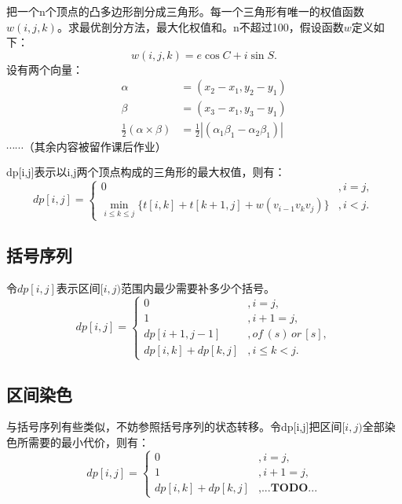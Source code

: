 把一个n个顶点的凸多边形剖分成三角形。每一个三角形有唯一的权值函数$w(i,j,k)$。求最优剖分方法，最大化权值和。n不超过100，假设函数$w$定义如下：
\begin{equation*}
    w(i,j,k)=e\cos C+i\sin S.
\end{equation*}
设有两个向量：
\begin{equation*}
    \begin{aligned}
        \alpha&=(x_2-x_1,y_2-y_1)\\
        \beta&=(x_3-x_1,y_3-y_1)\\
        \frac{1}{2}(\alpha\times\beta)&=\frac{1}{2}|(\alpha_1\beta_1-\alpha_2\beta_1)|
    \end{aligned}
\end{equation*}
$\cdots\cdots（其余内容被留作课后作业）$

dp[i,j]表示以i,j两个顶点构成的三角形的最大权值，则有：
\begin{equation*}
    dp[i,j]=
    \begin{cases}
        0&,i=j,\\
        \min\limits_{i\le k\le j}\{t[i,k]+t[k+1,j]+w(v_{i-1}v_kv_j)\}&,i<j.
    \end{cases}
\end{equation*}
\subsection{括号序列}
令$dp[i,j]$表示区间$[i,j)$范围内最少需要补多少个括号。
\begin{equation*}
    dp[i,j]=
    \begin{cases}
        0&,i=j,\\
        1&,i+1=j,\\
        dp[i+1,j-1]&,of\,(s)\,or\,[s],\\
        dp[i,k]+dp[k,j]&,i\le k<j.
    \end{cases}
\end{equation*}
\subsection{区间染色}
与括号序列有些类似，不妨参照括号序列的状态转移。令dp[i,j]把区间$[i,j)$全部染色所需要的最小代价，则有：
\begin{equation*}
    dp[i,j]=
    \begin{cases}
        0&,i=j,\\
        1&,i+1=j,\\
        dp[i,k]+dp[k,j]&,\textbf{...TODO...}
    \end{cases}
\end{equation*}
